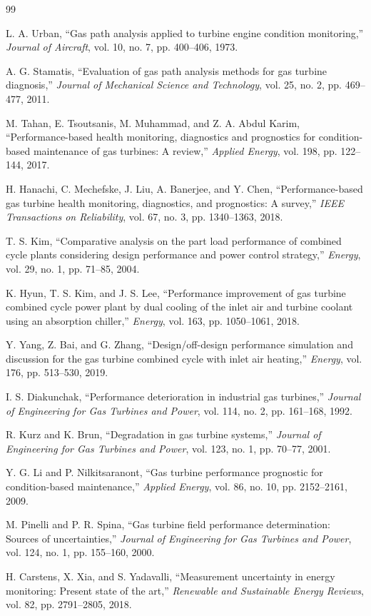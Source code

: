 \documentclass[12pt,a4paper]{article}
\begin{document}
\begin{thebibliography}{99}

L. A. Urban, ``Gas path analysis applied to turbine engine condition monitoring,'' \emph{Journal of Aircraft}, vol. 10, no. 7, pp. 400--406, 1973.

A. G. Stamatis, ``Evaluation of gas path analysis methods for gas turbine diagnosis,'' \emph{Journal of Mechanical Science and Technology}, vol. 25, no. 2, pp. 469--477, 2011.

M. Tahan, E. Tsoutsanis, M. Muhammad, and Z. A. Abdul Karim, ``Performance-based health monitoring, diagnostics and prognostics for condition-based maintenance of gas turbines: A review,'' \emph{Applied Energy}, vol. 198, pp. 122--144, 2017.

H. Hanachi, C. Mechefske, J. Liu, A. Banerjee, and Y. Chen, ``Performance-based gas turbine health monitoring, diagnostics, and prognostics: A survey,'' \emph{IEEE Transactions on Reliability}, vol. 67, no. 3, pp. 1340--1363, 2018.

T. S. Kim, ``Comparative analysis on the part load performance of combined cycle plants considering design performance and power control strategy,'' \emph{Energy}, vol. 29, no. 1, pp. 71--85, 2004.

K. Hyun, T. S. Kim, and J. S. Lee, ``Performance improvement of gas turbine combined cycle power plant by dual cooling of the inlet air and turbine coolant using an absorption chiller,'' \emph{Energy}, vol. 163, pp. 1050--1061, 2018.

Y. Yang, Z. Bai, and G. Zhang, ``Design/off-design performance simulation and discussion for the gas turbine combined cycle with inlet air heating,'' \emph{Energy}, vol. 176, pp. 513--530, 2019.

I. S. Diakunchak, ``Performance deterioration in industrial gas turbines,'' \emph{Journal of Engineering for Gas Turbines and Power}, vol. 114, no. 2, pp. 161--168, 1992.

R. Kurz and K. Brun, ``Degradation in gas turbine systems,'' \emph{Journal of Engineering for Gas Turbines and Power}, vol. 123, no. 1, pp. 70--77, 2001.

Y. G. Li and P. Nilkitsaranont, ``Gas turbine performance prognostic for condition-based maintenance,'' \emph{Applied Energy}, vol. 86, no. 10, pp. 2152--2161, 2009.

M. Pinelli and P. R. Spina, ``Gas turbine field performance determination: Sources of uncertainties,'' \emph{Journal of Engineering for Gas Turbines and Power}, vol. 124, no. 1, pp. 155--160, 2000.

H. Carstens, X. Xia, and S. Yadavalli, ``Measurement uncertainty in energy monitoring: Present state of the art,'' \emph{Renewable and Sustainable Energy Reviews}, vol. 82, pp. 2791--2805, 2018.

\end{thebibliography}
\end{document}
